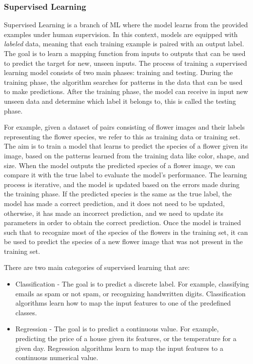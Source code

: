 \subsubsection{Supervised Learning}
\label{subsubsec:supervised_ml}
Supervised Learning is a branch of ML where the model learns from the provided examples under human supervision.
In this context, models are equipped with \textit{labeled} data, meaning that each training example is paired with an output label.
The goal is to learn a mapping function from inputs to outputs that can be used to predict the target for new, unseen inputs.
The process of training a supervised learning model consists of two main phases: training and testing.
During the training phase, the algorithm searches for patterns in the data that can be used to make predictions.
After the training phase, the model can receive in input new unseen data and determine which label it belongs to, this is called the testing phase.

For example, given a dataset of pairs consisting of flower images and their labels representing the flower species, we refer to this as training data or training set.
The aim is to train a model that learns to predict the species of a flower given its image, based on the patterns learned from the training data like color, shape, and size.
When the model outputs the predicted species of a flower image, we can compare it with the true label to evaluate the model's performance.
The learning process is iterative, and the model is updated based on the errors made during the training phase.
If the predicted species is the same as the true label, the model has made a correct prediction, and it does not need to be updated, otherwise, it has made an incorrect prediction, and we need to update its parameters in order to obtain the correct prediction.
Once the model is trained such that to recognize most of the species of the flowers in the training set, it can be used to predict the species of a new flower image that was not present in the training set.


There are two main categories of supervised learning that are:
\begin{itemize}
    \item Classification - The goal is to predict a discrete label.
    For example, classifying emails as spam or not spam, or recognizing handwritten digits.
    Classification algorithms learn how to map the input features to one of the predefined classes.

    \item Regression - The goal is to predict a continuous value.
    For example, predicting the price of a house given its features, or the temperature for a given day.
    Regression algorithms learn to map the input features to a continuous numerical value.

\end{itemize}

